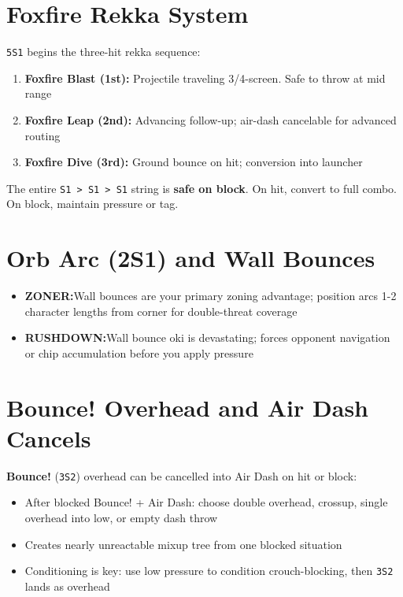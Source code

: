\documentclass[12pt, a4paper]{report}
\newcommand{\notation}[1]{{\small\texttt{\textcolor{ahriCyan}{#1}}}}
\newcommand{\movename}[1]{\textbf{\textcolor{ahriGold}{#1}}}
\newcommand{\zoner}{\textcolor{ahriCyan}{\bfseries\sffamily{\small $\blacktriangleright$} ZONER:}\;}
\newcommand{\rushdown}{\textcolor{ahriMagenta}{\bfseries\sffamily{\small $\blacktriangleright$} RUSHDOWN:}\;}
\begin{document}
\section{Foxfire Rekka System}

\notation{5S1} begins the three-hit rekka sequence:

\begin{enumerate}
  \item \movename{Foxfire Blast (1st):} Projectile traveling 3/4-screen. Safe to throw at mid range
  \item \movename{Foxfire Leap (2nd):} Advancing follow-up; air-dash cancelable for advanced routing
  \item \movename{Foxfire Dive (3rd):} Ground bounce on hit; conversion into launcher
\end{enumerate}

\begin{tipbox}
The entire \notation{S1 > S1 > S1} string is \textbf{safe on block}. On hit, convert to full combo. On block, maintain pressure or tag.
\end{tipbox}

\section{Orb Arc (2S1) and Wall Bounces}

\begin{itemize}
  \item \zoner Wall bounces are your primary zoning advantage; position arcs 1-2 character lengths from corner for double-threat coverage
  \item \rushdown Wall bounce oki is devastating; forces opponent navigation or chip accumulation before you apply pressure
\end{itemize}

\section{Bounce! Overhead and Air Dash Cancels}

\movename{Bounce!} (\notation{3S2}) overhead can be cancelled into Air Dash on hit or block:

\begin{itemize}
  \item After blocked Bounce! + Air Dash: choose double overhead, crossup, single overhead into low, or empty dash throw
  \item Creates nearly unreactable mixup tree from one blocked situation
  \item Conditioning is key: use low pressure to condition crouch-blocking, then \notation{3S2} lands as overhead
\end{itemize}
\end{document}
